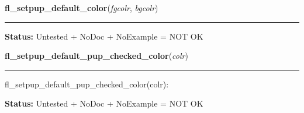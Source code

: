     \vspace{0.5ex}

\hspace{.8\funcindent}\begin{boxedminipage}{\funcwidth}

    \raggedright \textbf{fl\_setpup\_default\_color}(\textit{fgcolr}, \textit{bgcolr})

    \vspace{-1.5ex}

    \rule{\textwidth}{0.5\fboxrule}
\setlength{\parskip}{2ex}
\setlength{\parskip}{1ex}
\textbf{Status:} Untested + NoDoc + NoExample = NOT OK



    \end{boxedminipage}

    \label{xformslib:library:fl_setpup_default_pup_checked_color}

    \vspace{0.5ex}

\hspace{.8\funcindent}\begin{boxedminipage}{\funcwidth}

    \raggedright \textbf{fl\_setpup\_default\_pup\_checked\_color}(\textit{colr})

    \vspace{-1.5ex}

    \rule{\textwidth}{0.5\fboxrule}
\setlength{\parskip}{2ex}
    fl\_setpup\_default\_pup\_checked\_color(colr):

\setlength{\parskip}{1ex}
\textbf{Status:} Untested + NoDoc + NoExample = NOT OK



    \end{boxedminipage}

    \label{xformslib:library:fl_setpup_default_fontsize}

    \vspace{0.5ex}


